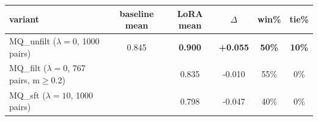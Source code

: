 \begin{tabular}{@{}l|c|cccc@{}}
\toprule
variant & baseline mean & LoRA mean & $\Delta$ & win\% & tie\% \\
\midrule
MQ\_unfilt  ($\lambda{=}0$, 1000 pairs) & 0.845 & \textbf{0.900} & \textbf{+0.055} & \textbf{50\%} & \textbf{10\%} \\
MQ\_filt   ($\lambda{=}0$, 767 pairs, m$\geq$0.2) &  & 0.835 & -0.010 & 55\% & 0\% \\
MQ\_sft    ($\lambda{=}10$, 1000 pairs) &  & 0.798 & -0.047 & 40\% & 0\% \\
\bottomrule
\end{tabular}

